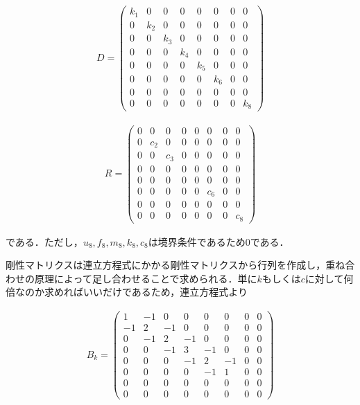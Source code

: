 \begin{eqnarray}
    D =
    \left(\begin{matrix}
        k_1 & 0   & 0   & 0   & 0   & 0   & 0   & 0   \\
        0   & k_2 & 0   & 0   & 0   & 0   & 0   & 0   \\
        0   & 0   & k_3 & 0   & 0   & 0   & 0   & 0   \\
        0   & 0   & 0   & k_4 & 0   & 0   & 0   & 0   \\
        0   & 0   & 0   & 0   & k_5 & 0   & 0   & 0   \\
        0   & 0   & 0   & 0   & 0   & k_6 & 0   & 0   \\
        0   & 0   & 0   & 0   & 0   & 0   & 0   & 0   \\
        0   & 0   & 0   & 0   & 0   & 0   & 0   & k_8
    \end{matrix}\right)
\end{eqnarray}

\begin{eqnarray}
    R = 
    \left(\begin{matrix}
        0   & 0   & 0   & 0   & 0   & 0   & 0   & 0   \\
        0   & c_2 & 0   & 0   & 0   & 0   & 0   & 0   \\
        0   & 0   & c_3 & 0   & 0   & 0   & 0   & 0   \\
        0   & 0   & 0   & 0   & 0   & 0   & 0   & 0   \\
        0   & 0   & 0   & 0   & 0   & 0   & 0   & 0   \\
        0   & 0   & 0   & 0   & 0   & c_6 & 0   & 0   \\
        0   & 0   & 0   & 0   & 0   & 0   & 0   & 0   \\
        0   & 0   & 0   & 0   & 0   & 0   & 0   & c_8
    \end{matrix}\right)
\end{eqnarray}

である．ただし，$u_8, f_8, m_8, k_8, c_8$は境界条件であるため$0$である．

剛性マトリクスは連立方程式にかかる剛性マトリクスから行列を作成し，重ね合わせの原理によって足し合わせることで求められる．単に$k$もしくは$c$に対して何倍なのか求めればいいだけであるため，連立方程式より

\begin{eqnarray}
    B_k = 
    \left(\begin{matrix}
        1   & -1  & 0   & 0   & 0  & 0  & 0  & 0  \\
        -1  & 2   & -1  & 0   & 0  & 0  & 0  & 0  \\
        0   & -1  & 2   & -1  & 0  & 0  & 0  & 0  \\
        0   & 0   & -1  & 3   & -1 & 0  & 0  & 0  \\
        0   & 0   & 0   & -1  & 2  & -1 & 0  & 0  \\
        0   & 0   & 0   & 0   & -1 & 1  & 0  & 0  \\
        0   & 0   & 0   & 0   & 0  & 0  & 0  & 0  \\
        0   & 0   & 0   & 0   & 0  & 0  & 0  & 0  
    \end{matrix}\right)
\end{eqnarray}

